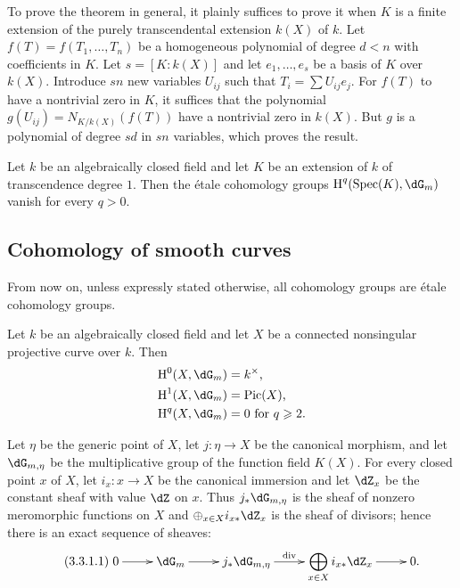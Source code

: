 To prove the theorem in general, it plainly suffices to prove it when
$K$ is a finite extension of the purely transcendental extension
$k(X)$ of $k$. Let $f(T)=f(T_1,\dotsc,T_n)$ be a homogeneous
polynomial of degree $d<n$ with coefficients in $K$. Let
$s=[K:k(X)]$ and let $e_1,\dotsc,e_s$ be a basis of $K$ over $k(X)$.
Introduce $sn$ new variables $U_{ij}$ such that
$T_i=\sum U_{ij}e_j$. For $f(T)$ to have a nontrivial zero in $K$, it
suffices that the polynomial $g(U_{ij})=N_{K/k(X)}(f(T))$ have a nontrivial
zero in $k(X)$. But $g$ is a polynomial of degree $sd$ in $sn$
variables, which proves the result.

\begin{corollary}\label{I:3-2-4}
Let $k$ be an algebraically closed field and let $K$ be an extension of
$k$ of transcendence degree $1$. Then the étale cohomology groups
$\h^q(\spec(K),\dG_m)$ vanish for every $q>0$.
\end{corollary}

\subsection{Cohomology of smooth curves}

From now on, unless expressly stated otherwise, all cohomology groups are
étale cohomology groups.

\begin{proposition}\label{I:3-3-1}
Let $k$ be an algebraically closed field and let $X$ be a connected
nonsingular projective curve over $k$. Then
\begin{align*}
  \h^0(X,\dG_m) &= k^\times \text{,} \\
  \h^1(X,\dG_m) &= \pic(X) \text{,} \\
  \h^q(X,\dG_m) &= 0 \text{ for $q\geqslant 2$.}
\end{align*}
\end{proposition}

Let $\eta$ be the generic point of $X$, let $j:\eta\to X$ be the
canonical morphism, and let $\dG_{m,\eta}$ be the multiplicative group of
the function field $K(X)$. For every closed point $x$ of $X$, let
$i_x:x\to X$ be the canonical immersion and let $\dZ_x$ be the constant
sheaf with value $\dZ$ on $x$. Thus $j_*\dG_{m,\eta}$ is the sheaf of
nonzero meromorphic functions on $X$ and
$\oplus_{x\in X}i_{x*}\dZ_x$ is the sheaf of divisors; hence there is an
exact sequence of sheaves:
\begin{equation*}\tag{3.3.1.1}\label{I:eq:3-3-1-1}
\xymatrix{
  0 \ar[r]
    & \dG_m \ar[r]
    & j_* \dG_{m,\eta} \ar[r]^-{\dv}
    & \displaystyle\bigoplus_{x\in X} i_{x*} \dZ_x \ar[r]
    & 0\text{.}
}
\end{equation*}

